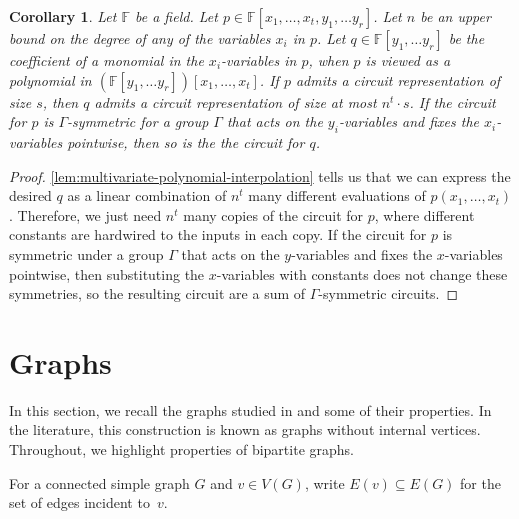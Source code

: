 \documentclass[11pt, DIV=15]{scrarticle}
\theoremstyle{definition}
\theoremstyle{plain}
\newtheorem{corollary}[definition]{Corollary}
\theoremstyle{remark}
\newcommand{\bbF}{\mathbb{F}}
\begin{document}
	
	\begin{corollary}
		\label{cor:interpolationTrickCircuits}
		Let $\bbF$ be a field. 	
		Let $p \in \bbF[x_1, \dots, x_t, y_1,\dots y_r]$. 
		Let $n$ be an upper bound on the degree of any of the variables $x_i$ in $p$.
		Let $q \in \bbF[y_1,\dots y_r]$ be the coefficient of a monomial in the $x_i$-variables in $p$, when $p$ is viewed as a polynomial in $(\bbF[y_1,\dots y_r])[x_1,\dots, x_t]$.
		If $p$ admits a circuit representation of size $s$, then $q$ admits a circuit representation of size at most $n^t \cdot s$.
		If the circuit for $p$ is $\Gamma$-symmetric for a group $\Gamma$ that acts on the $y_i$-variables and fixes the $x_i$-variables pointwise, then so is the the circuit for $q$.
	\end{corollary}
	\begin{proof}
		\cref{lem:multivariate-polynomial-interpolation} tells us that we can express the desired $q$ as a linear combination of $n^t$ many different evaluations of $p(x_1, \dots, x_t)$. Therefore, we just need $n^t$ many copies of the circuit for $p$, where different constants are hardwired to the inputs in each copy.
		If the circuit for $p$ is symmetric under a group $\Gamma$ that acts on the $y$-variables and fixes the $x$-variables pointwise, then substituting the $x$-variables with constants does not change these symmetries, so the resulting circuit are a sum of $\Gamma$-symmetric circuits.
	\end{proof}	
	
	
	
	
	
	
	
	
	
	
	
	\section{ Graphs}
	\label{sec:cfi}
	In this section, we recall the  graphs studied in \cite{roberson_oddomorphisms_2022} and some of their properties.
	In the literature, this construction is known as  graphs without internal vertices.
	Throughout, we highlight properties of bipartite  graphs.
	
	For a connected simple graph $G$ and $v \in V(G)$, write $E(v) \subseteq E(G)$ for the set of edges incident to~$v$.
	
\end{document}
